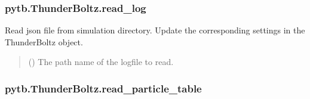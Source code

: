 \documentclass[letterpaper,10pt,english,openany,oneside]{sphinxmanual}
\begin{document}
\begin{fulllineitems}
\begin{fulllineitems}
\begin{quote}
\begin{description}
\end{description}\end{quote}

\end{fulllineitems}


\sphinxstepscope


\subsubsection{pytb.ThunderBoltz.read\_log}
\label{\detokenize{api/pytb.ThunderBoltz.read_log:pytb-thunderboltz-read-log}}\label{\detokenize{api/pytb.ThunderBoltz.read_log::doc}}

\begin{fulllineitems}
\label{\detokenize{api/pytb.ThunderBoltz.read_log:pytb.ThunderBoltz.read_log}}
\pysigstartsignatures
{}
\pysigstopsignatures
\sphinxAtStartPar
Read json file from simulation directory. Update
the corresponding settings in the ThunderBoltz object.
\begin{quote}\begin{description}
\sphinxAtStartPar
{} () \textendash{} The path name of the logfile to read.

\end{description}\end{quote}

\end{fulllineitems}


\sphinxstepscope


\subsubsection{pytb.ThunderBoltz.read\_particle\_table}
\label{\detokenize{api/pytb.ThunderBoltz.read_particle_table:pytb-thunderboltz-read-particle-table}}\label{\detokenize{api/pytb.ThunderBoltz.read_particle_table::doc}}


\end{fulllineitems}
\end{document}
